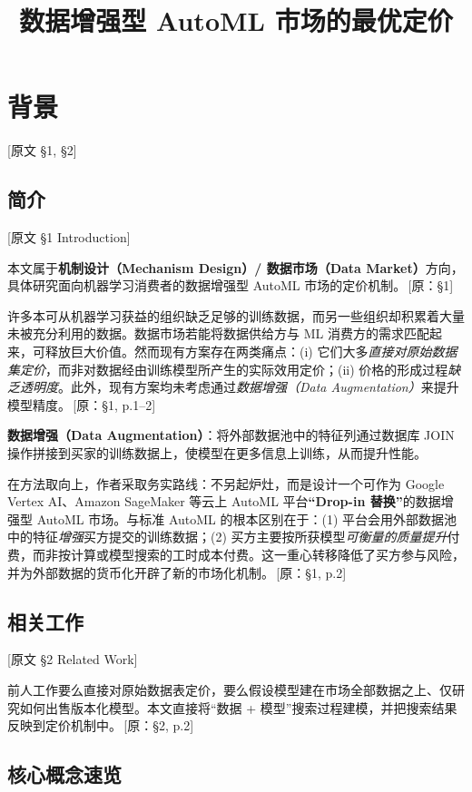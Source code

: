 \documentclass[12pt,a4paper]{article}
\title{数据增强型 AutoML 市场的最优定价}
\author{}
\date{}
\newcommand{\srcref}[1]{\textcolor{black!65}{\footnotesize\,[原：#1]}}
\newcommand{\secref}[1]{\hspace{0.6em} \textcolor{black!80}{\footnotesize [原文 #1]}}
\theoremstyle{definition}
\begin{document}
\maketitle

\section{背景}
\secref{§1, §2}

\subsection{简介}
\secref{§1 Introduction}

本文属于\textbf{机制设计（Mechanism Design）/ 数据市场（Data Market）}方向，具体研究面向机器学习消费者的数据增强型 AutoML 市场的定价机制。\srcref{§1}

许多本可从机器学习获益的组织缺乏足够的训练数据，而另一些组织却积累着大量未被充分利用的数据。数据市场若能将数据供给方与 ML 消费方的需求匹配起来，可释放巨大价值。然而现有方案存在两类痛点：(i) 它们大多\emph{直接对原始数据集定价}，而非对数据经由训练模型所产生的实际效用定价；(ii) 价格的形成过程\emph{缺乏透明度}。此外，现有方案均未考虑通过\emph{数据增强（Data Augmentation）}来提升模型精度。\srcref{§1, p.1--2}

\textbf{数据增强（Data Augmentation）}：将外部数据池中的特征列通过数据库 JOIN 操作拼接到买家的训练数据上，使模型在更多信息上训练，从而提升性能。

在方法取向上，作者采取务实路线：不另起炉灶，而是设计一个可作为 Google Vertex AI、Amazon SageMaker 等云上 AutoML 平台\textbf{``Drop-in 替换''}的数据增强型 AutoML 市场。与标准 AutoML 的根本区别在于：(1) 平台会用外部数据池中的特征\emph{增强}买方提交的训练数据；(2) 买方主要按所获模型\emph{可衡量的质量提升}付费，而非按计算或模型搜索的工时成本付费。这一重心转移降低了买方参与风险，并为外部数据的货币化开辟了新的市场化机制。\srcref{§1, p.2}

\subsection{相关工作}
\secref{§2 Related Work}

前人工作要么直接对原始数据表定价，要么假设模型建在市场全部数据之上、仅研究如何出售版本化模型。本文直接将``数据 + 模型''搜索过程建模，并把搜索结果反映到定价机制中。\srcref{§2, p.2}

\subsection{核心概念速览}
\end{document}
